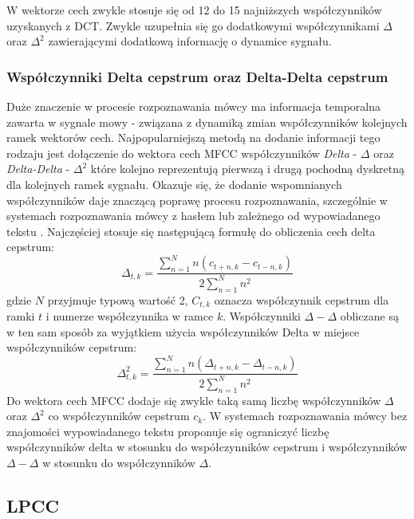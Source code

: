 W wektorze cech zwykle stosuje się od 12 do 15 najniższych współczynników uzyskanych z DCT. Zwykle uzupełnia się go dodatkowymi współczynnikami $\Delta$ oraz $\Delta^2$ zawierającymi dodatkową informację o dynamice sygnału. 

\subsubsection{Współczynniki Delta cepstrum oraz Delta-Delta cepstrum}

  Duże znaczenie w procesie rozpoznawania mówcy ma informacja temporalna zawarta w sygnale mowy - związana z dynamiką zmian współczynników kolejnych ramek wektorów cech. Najpopularniejszą metodą na dodanie informacji tego rodzaju jest dołączenie do wektora cech MFCC współczynników \textit{Delta} - $\Delta$ oraz \textit{Delta-Delta} - $\Delta^2$ które kolejno reprezentują pierwszą i drugą pochodną dyskretną dla kolejnych ramek sygnału. Okazuje się, że dodanie wspomnianych współczynników daje znaczącą poprawę procesu rozpoznawania, szczególnie w systemach rozpoznawania mówcy z hasłem lub zależnego od wypowiadanego tekstu \cite{delta}. Najczęściej stosuje się następującą formułę do obliczenia cech delta cepstrum:
\begin{equation}
  \Delta_{t, k} = \frac{\sum^N_{n=1} n(c_{t+n,k} - c_{t-n,k})}{2\sum^N_{n=1} n^2} 
\end{equation}
gdzie $N$ przyjmuje typową wartość 2, $C_{t,k}$ oznacza współczynnik cepstrum dla ramki $t$ i numerze współczynnika w ramce $k$. Współczynniki $\Delta-\Delta$ obliczane są w ten sam sposób za wyjątkiem użycia współczynników Delta w miejsce współczynników cepstrum:
\begin{equation}
  \Delta^2_{t, k} = \frac{\sum^N_{n=1} n(\Delta_{t+n,k} - \Delta_{t-n,k})}{2\sum^N_{n=1} n^2} 
\end{equation}
Do wektora cech MFCC dodaje się zwykle taką samą liczbę współczynników $\Delta$ oraz $\Delta^2$ co współczynników cepstrum $c_{k}$. W systemach rozpoznawania mówcy bez znajomości wypowiadanego tekstu proponuje się ograniczyć liczbę współczynników delta w stosunku do współczynników cepstrum i współczynników $\Delta-\Delta$ w stosunku do współczynników $\Delta$\cite{fosr}.

\subsection{LPCC}
\label{LPCC}

